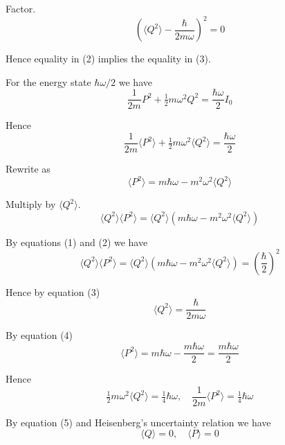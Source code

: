 Factor.
\begin{equation*}
\left(\langle Q^2\rangle-\frac{\hbar}{2m\omega}\right)^2=0
\tag{3}
\end{equation*}

Hence equality in (2) implies the equality in (3).

\bigskip
For the energy state $\hbar\omega/2$ we have
\begin{equation*}
\frac{1}{2m}P^2+\tfrac{1}{2}m\omega^2Q^2=\frac{\hbar\omega}{2}I_0
\end{equation*}

Hence
\begin{equation*}
\frac{1}{2m}\langle P^2\rangle+\tfrac{1}{2}m\omega^2\langle Q^2\rangle=\frac{\hbar\omega}{2}
\end{equation*}

Rewrite as
\begin{equation*}
\langle P^2\rangle=m\hbar\omega-m^2\omega^2\langle Q^2\rangle
\tag{4}
\end{equation*}

Multiply by $\langle Q^2\rangle$.
\begin{equation*}
\langle Q^2\rangle\langle P^2\rangle=\langle Q^2\rangle
\left(m\hbar\omega-m^2\omega^2\langle Q^2\rangle\right)
\end{equation*}

By equations (1) and (2) we have
\begin{equation*}
\langle Q^2\rangle\langle P^2\rangle=\langle Q^2\rangle
\left(m\hbar\omega-m^2\omega^2\langle Q^2\rangle\right)=\left(\frac{\hbar}{2}\right)^2
\tag{5}
\end{equation*}

Hence by equation (3)
\begin{equation*}
\langle Q^2\rangle=\frac{\hbar}{2m\omega}
\end{equation*}

By equation (4)
\begin{equation*}
\langle P^2\rangle=m\hbar\omega-\frac{m\hbar\omega}{2}=\frac{m\hbar\omega}{2}
\end{equation*}

Hence
\begin{equation*}
\tfrac{1}{2}m\omega^2\langle Q^2\rangle=\tfrac{1}{4}\hbar\omega,\quad
\frac{1}{2m}\langle P^2\rangle=\tfrac{1}{4}\hbar\omega
\end{equation*}

By equation (5) and Heisenberg's uncertainty relation we have
\begin{equation*}
\langle Q\rangle=0,\quad\langle P\rangle=0
\end{equation*}


